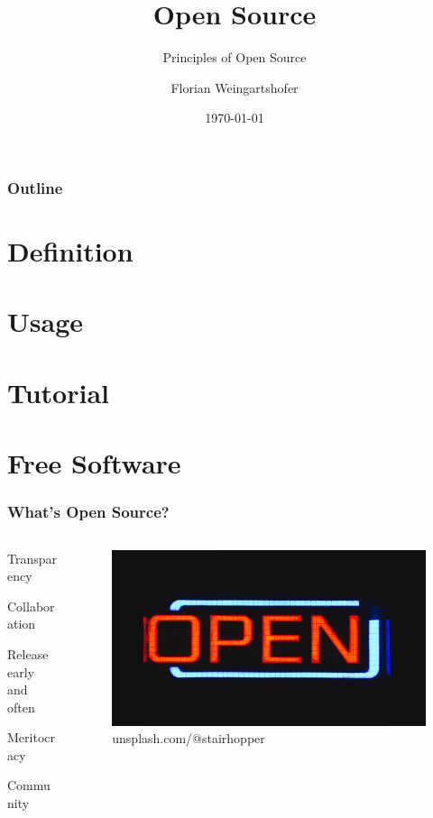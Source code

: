\documentclass{beamer}
\title{Open Source}
\subtitle{Principles of Open Source}
\author{Florian Weingartshofer}
\institute{FH Hagenberg}
\date{\today}
\begin{document}
\titlepage

\begin{frame}
  \frametitle{Outline}
  \tableofcontents
\end{frame}

\section{Definition}
\section{Usage}
\section{Tutorial}
\section{Free Software}

\begin{frame}
  \frametitle{What's Open Source?}
  \begin{columns}
    \begin{column}{0.5\textwidth}
      \begin{center}
        \Large
        Transparency

        Collaboration

        Release early and often

        Meritocracy

        Community
      \end{center}
    \end{column}
    \begin{column}{0.5\textwidth}  %
      \begin{center}
        \begin{figure}
          \includegraphics[scale=0.03]{./img/open.jpg}
          \caption{unsplash.com/@stairhopper}
        \end{figure}
      \end{center}
    \end{column}
  \end{columns}
\end{frame}
\end{document}
